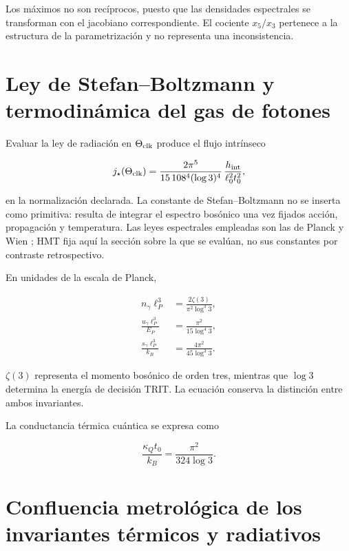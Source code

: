 Los m\'aximos no son rec\'iprocos, puesto que las densidades espectrales se
transforman con el jacobiano correspondiente. El cociente \(x_5/x_3\)
pertenece a la estructura de la parametrizaci\'on y no representa una
inconsistencia.

\section{Ley de Stefan--Boltzmann y termodin\'amica del gas de fotones}

Evaluar la ley de radiaci\'on en \(\Theta_{\rm clk}\) produce el flujo intr\'inseco

\begin{equation}
j_\star(\Theta_{\rm clk})
=\frac{2\pi^5}{15\,108^4(\log3)^4}\,
\frac{h_{\rm int}}{\ell_0^2t_0^2},
\label{eq:stefan-hmt}
\end{equation}

en la normalizaci\'on declarada. La constante de Stefan--Boltzmann no se inserta como primitiva: resulta de integrar el espectro bos\'onico una vez fijados acci\'on, propagaci\'on y temperatura.
Las leyes espectrales empleadas son las de Planck y Wien \cite{Planck,Wien}; HMT fija aqu\'i la secci\'on sobre la que se eval\'uan, no sus constantes por contraste retrospectivo.

En unidades de la escala de Planck,

\begin{align}
n_\gamma\ell_P^3
&=\frac{2\zeta(3)}{\pi^2\log^3 3},
\label{eq:photon-number}\\
\frac{u_\gamma\ell_P^3}{E_P}
&=\frac{\pi^2}{15\log^4 3},
\label{eq:photon-energy}\\
\frac{s_\gamma\ell_P^3}{k_B}
&=\frac{4\pi^2}{45\log^3 3}.
\label{eq:photon-entropy}
\end{align}

\(\zeta(3)\) representa el momento bos\'onico de orden tres, mientras que
\(\log3\) determina la energ\'ia de decisi\'on TRIT. La ecuaci\'on conserva la
distinci\'on entre ambos invariantes.

La conductancia t\'ermica cu\'antica se expresa como

\begin{equation}
\frac{\kappa_Qt_0}{k_B}=\frac{\pi^2}{324\log3}.
\label{eq:thermal-conductance}
\end{equation}

\section{Confluencia metrológica de los invariantes térmicos y radiativos}

